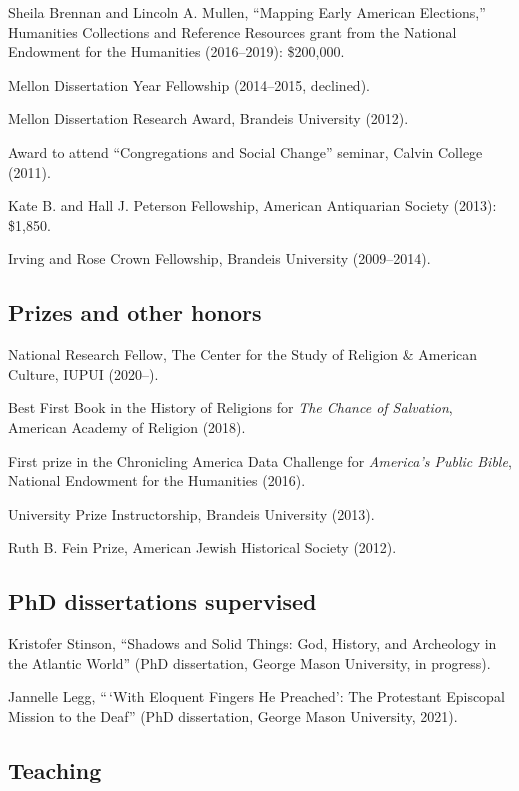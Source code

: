 \documentclass[11pt]{article}
\begin{document}
Sheila Brennan and Lincoln A. Mullen, ``Mapping Early American Elections,'' Humanities Collections and Reference Resources grant from the National Endowment for the Humanities (2016--2019): \$200,000. 

Mellon Dissertation Year Fellowship (2014--2015, declined).

Mellon Dissertation Research Award, Brandeis University (2012).

Award to attend ``Congregations and Social Change'' seminar, Calvin College (2011).

Kate B. and Hall J. Peterson Fellowship, American Antiquarian Society (2013): \$1,850.

Irving and Rose Crown Fellowship, Brandeis University (2009--2014).

\subsection{Prizes and other honors}\label{Prizes}

National Research Fellow, The Center for the Study of Religion \& American Culture, IUPUI (2020--).

Best First Book in the History of Religions for \emph{The Chance of Salvation}, American Academy of Religion (2018).

First prize in the Chronicling America Data Challenge for \emph{America's Public Bible}, National Endowment for the Humanities (2016).

University Prize Instructorship, Brandeis University (2013).

Ruth B. Fein Prize, American Jewish Historical Society (2012). 

\subsection{PhD dissertations supervised}\label{Dissertations supervised}

Kristofer Stinson, ``Shadows and Solid Things: God, History, and Archeology in the Atlantic World'' (PhD dissertation, George Mason University, in progress).

Jannelle Legg, ``\,`With Eloquent Fingers He Preached': The Protestant Episcopal Mission to the Deaf'' (PhD dissertation, George Mason University, 2021).

\subsection{Teaching}\label{Teaching}
\end{document}
